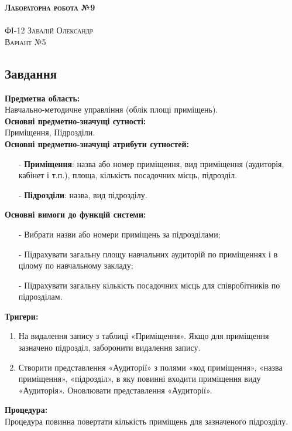 \documentclass[a4paper,12pt]{article}
\begin{document}
	\begin{center}
		{\Large \bfseries \textsc{Лабораторна робота №9}}\\
		\hrulefill\\
		\Large \textsc{ФІ-12 Завалій Олександр\\ Варіант №5}
	\end{center}
	\begin{center}
		\section*{\bfseries{Завдання}}
	\end{center} 
	\textbf{Предметна область:} \\
	Навчально-методичне управління (облік площі приміщень). \\
	\textbf{Основні предметно-значущі сутності:} \\
	Приміщення, Підрозділи. \\
	\textbf{Основні предметно-значущі атрибути сутностей:}
	\begin{enumerate}
		\item[-] \textbf{Приміщення}: назва або номер приміщення, вид приміщення (аудиторія, кабінет і т.п.), площа, кількість посадочних місць, підрозділ. 
		\item[-] \textbf{Підрозділи}: назва, вид підрозділу.
	\end{enumerate}
	\textbf{Основні вимоги до функцій системи:}
	\begin{enumerate}
		\item[-] Вибрати назви або номери приміщень за підрозділами;
		\item[-] Підрахувати загальну площу навчальних аудиторій по приміщеннях і в цілому по навчальному закладу;
		\item[-] Підрахувати загальну кількість посадочних місць для співробітників по підрозділам.
	\end{enumerate}
	\textbf{Тригери:}
	\begin{enumerate}
		\item На видалення запису з таблиці «Приміщення». Якщо для приміщення зазначено підрозділ, заборонити видалення запису.
		\item Створити представлення «Аудиторії» з полями «код приміщення», «назва приміщення», «підрозділ», в яку повинні входити приміщення виду «Аудиторія». Оновлювати представлення «Аудиторії».
	\end{enumerate}
	\textbf{Процедура:}\\
	Процедура повинна повертати кількість приміщень для зазначеного підрозділу. \\
\end{document}
